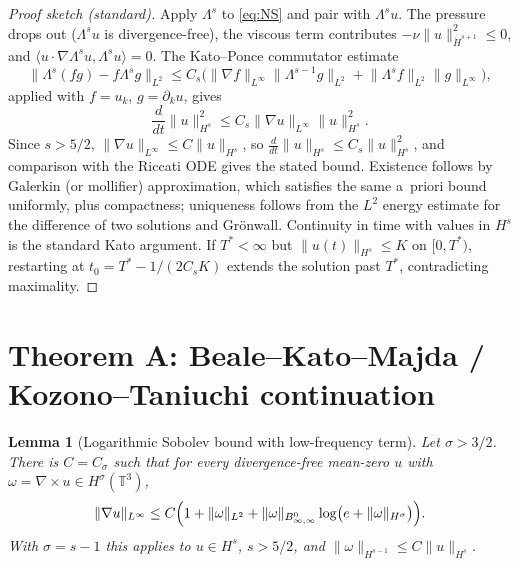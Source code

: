 \documentclass[11pt,reqno]{amsart}
\newtheorem{lemma}{Lemma}[section]
\theoremstyle{definition}
\theoremstyle{remark}
\newcommand{\T}{\mathbb{T}^3}
\newcommand{\Bz}{B^0_{\infty,\infty}}
\newcommand{\dH}[1]{\dot H^{#1}}
\newcommand{\norm}[1]{\lVert #1\rVert}
\newcommand{\ip}[2]{\langle #1,#2\rangle}
\newcommand{\curl}{\nabla\times}
\begin{document}
\begin{proof}[Proof sketch (standard)]
Apply $\Lambda^s$ to \eqref{eq:NS} and pair with $\Lambda^su$. The pressure drops out ($\Lambda^s u$ is divergence-free), the viscous term contributes $-\nu\norm{u}_{\dH{s+1}}^2\le0$, and $\ip{u\cdot\nabla\Lambda^su}{\Lambda^su}=0$. The Kato--Ponce commutator estimate \cite{KatoPonce1988}
\[
\norm{\Lambda^s(fg)-f\Lambda^sg}_{L^2}\le C_s\bigl(\norm{\nabla f}_{L^\infty}\norm{\Lambda^{s-1}g}_{L^2}+\norm{\Lambda^sf}_{L^2}\norm{g}_{L^\infty}\bigr),
\]
applied with $f=u_k$, $g=\partial_ku$, gives
\begin{equation}\label{eq:Hs}
\frac{d}{dt}\norm{u}_{H^s}^2\le C_s\norm{\nabla u}_{L^\infty}\norm{u}_{H^s}^2 .
\end{equation}
Since $s>5/2$, $\norm{\nabla u}_{L^\infty}\le C\norm{u}_{H^s}$, so $\frac{d}{dt}\norm{u}_{H^s}\le C_s\norm{u}_{H^s}^2$, and comparison with the Riccati ODE gives the stated bound. Existence follows by Galerkin (or mollifier) approximation, which satisfies the same a~priori bound uniformly, plus compactness; uniqueness follows from the $L^2$ energy estimate for the difference of two solutions and Gr\"onwall. Continuity in time with values in $H^s$ is the standard Kato argument. If $T^*<\infty$ but $\norm{u(t)}_{H^s}\le K$ on $[0,T^*)$, restarting at $t_0=T^*-1/(2C_sK)$ extends the solution past $T^*$, contradicting maximality.
\end{proof}

\section{Theorem A: Beale--Kato--Majda / Kozono--Taniuchi continuation}\label{sec:A}

\begin{lemma}[Logarithmic Sobolev bound with low-frequency term]\label{lem:KT}
Let $\sigma>3/2$. There is $C=C_\sigma$ such that for every divergence-free mean-zero $u$ with $\omega=\curl u\in H^\sigma(\T)$,
\begin{equation}\label{eq:KT}
\norm{\nabla u}_{L^\infty}\le C\Bigl(1+\norm{\omega}_{L^2}+\norm{\omega}_{\Bz}\log\bigl(e+\norm{\omega}_{H^\sigma}\bigr)\Bigr).
\end{equation}
With $\sigma=s-1$ this applies to $u\in H^s$, $s>5/2$, and $\norm{\omega}_{H^{s-1}}\le C\norm{u}_{H^s}$.
\end{lemma}
\end{document}
